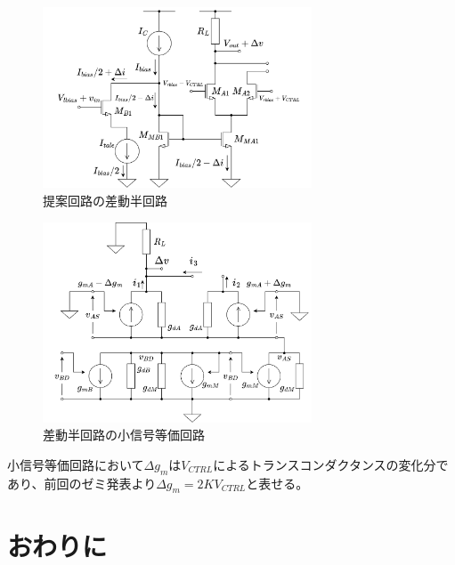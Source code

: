 \documentclass[twocolumn]{jsarticle}
\begin{document}
    \begin{figure}[H]
        \begin{center}
            \includegraphics*[width = 80mm]{figures/NtoNHalfDiff.png}
            \caption{提案回路の差動半回路}
            \label{fig:NtoN_half}
        \end{center}
    \end{figure}
    \begin{figure}[H]
        \begin{center}
            \includegraphics*[width = 80mm]{figures/NtoNHalfDiffEqual.png}
            \caption{差動半回路の小信号等価回路}
            \label{fig:NtoN_half_equal}
        \end{center}        
    \end{figure}
    小信号等価回路において$\Delta g_{m}$は$V_{CTRL}$によるトランスコンダクタンスの変化分であり、前回のゼミ発表より$\Delta g_{m}=2KV_{CTRL}$と表せる。


\section{おわりに}
\end{document}
